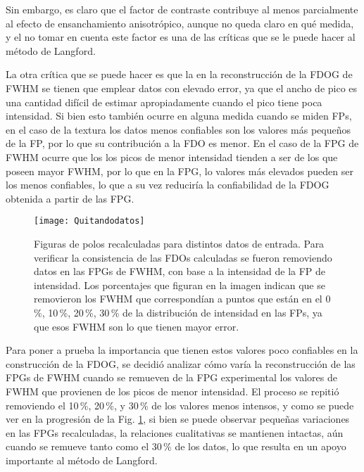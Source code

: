Sin embargo, es claro que el factor de contraste contribuye al menos parcialmente al efecto de ensanchamiento anisotrópico, aunque no queda claro en qué medida, y el no tomar en cuenta este factor es una de las críticas que se le puede hacer al método de Langford.

La otra crítica que se puede hacer es que la en la reconstrucción de la FDOG de FWHM se tienen que emplear datos con elevado error, ya que el ancho de pico es una cantidad difícil de estimar apropiadamente cuando el pico tiene poca intensidad.
Si bien esto también ocurre en alguna medida cuando se miden FPs, en el caso de la textura los datos menos confiables son los valores más pequeños de la FP, por lo que su contribución a la FDO es menor.
En el caso de la FPG de FWHM ocurre que los los picos de menor intensidad tienden a ser de los que poseen mayor FWHM, por  lo que en la FPG, lo valores más elevados pueden ser los menos confiables, lo que a su vez reduciría la confiabilidad de la FDOG obtenida a partir de las FPG.

\begin{figure}[!htb]
  \centering
  \texttt{[image: Quitandodatos]}
  \caption{Figuras de polos recalculadas para distintos datos de entrada. Para verificar la consistencia de las FDOs calculadas se fueron removiendo datos en las FPGs de FWHM, con base a la intensidad de la FP de intensidad. Los porcentajes que figuran en la imagen indican que se removieron los FWHM que correspondían a puntos que están en el 0\,\%, 10\,\%, 20\,\%, 30\,\% de la distribución de intensidad en las FPs, ya que esos FWHM son lo que tienen mayor error.}
  \label{fig:IFFWHMRecvsCrop}
\end{figure}

Para poner a prueba la importancia que tienen estos valores poco confiables en la construcción de la FDOG, se decidió analizar cómo varía la reconstrucción de las FPGs de FWHM cuando se remueven de la FPG experimental los valores de FWHM que provienen de los picos de menor intensidad.
El proceso se repitió removiendo el 10\,\%, 20\,\%, y 30\,\% de los valores menos intensos, y como se puede ver en la progresión de la Fig. \ref{fig:IFFWHMRecvsCrop}, si bien se puede observar pequeñas variaciones en las FPGs recalculadas, la relaciones cualitativas se mantienen intactas, aún cuando se remueve tanto como el 30\,\% de los datos, lo que resulta en un apoyo importante al método de Langford.

